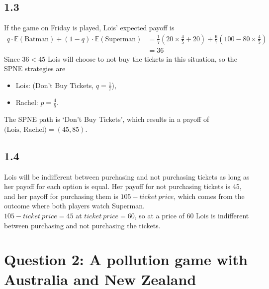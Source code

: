 \documentclass{article}
\newcommand{\E}[1]{\mathbb{E}(\mbox{#1})}
\begin{document}
\subsection*{1.3}
If the game on Friday is played, Lois' expected payoff is
\begin{align*}
    q \cdot \E{Batman} + (1-q) \cdot \E{Superman} &= \frac{1}{7}(20 \times \frac{4}{5} + 20) + \frac{6}{7}(100 - 80 \times \frac{4}{5})\\
    &= 36
\end{align*}
Since $36 < 45$ Lois will choose to not buy the tickets in this situation, so the SPNE strategies are
\begin{itemize}
    \item Lois: (Don't Buy Tickets, $q = \frac{1}{7}$),
    \item Rachel: $p = \frac{4}{5}$.
\end{itemize}
The SPNE path is `Don't Buy Tickets', which results in a payoff of $\mbox{(Lois, Rachel)} = (45, 85)$.

\subsection*{1.4}
Lois will be indifferent between purchasing and not purchasing tickets as long as her payoff for each option is equal. Her payoff for not purchasing tickets is 45, and her payoff for purchasing them is $105-ticket\ price$, which comes from the outcome where both players watch Superman.\\[2mm]
$105-ticket\ price = 45$ at $ticket\ price = 60$, so at a price of 60 Lois is indifferent between purchasing and not purchasing the tickets.

\section*{Question 2: A pollution game with Australia and New Zealand}
\end{document}
